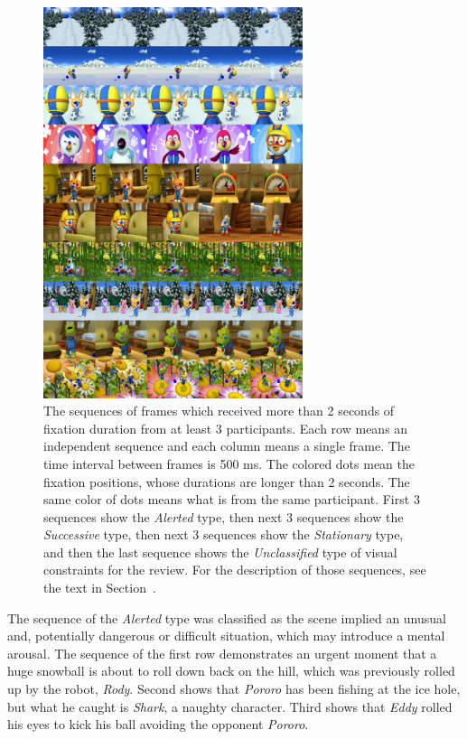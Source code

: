 \documentclass[oneside,master]{snueethesis}
\begin{document}
\begin{figure}
  \centerline{\includegraphics[width=76mm]{./eps/long_fixations_types.png}}
  \caption[The samples of sequence types]{The sequences of frames which received more than 2 seconds of fixation duration from at least 3 participants. Each row means an independent sequence and each column means a single frame. The time interval between frames is 500 ms. The colored dots mean the fixation positions, whose durations are longer than 2 seconds. The same color of dots means what is from the same participant. First 3 sequences show the \textit{Alerted} type, then next 3 sequences show the \textit{Successive} type, then next 3 sequences show the \textit{Stationary} type, and then the last sequence shows the \textit{Unclassified} type of visual constraints for the review. For the description of those sequences, see the text in Section~\textit{}.}
  \label{fig:long-fixations}
\end{figure}

The sequence of the \textit{Alerted} type was classified as the scene implied an unusual and, potentially dangerous or difficult situation, which may introduce a mental arousal. The sequence of the first row demonstrates an urgent moment that a huge snowball is about to roll down back on the hill, which was previously rolled up by the robot, \textit{Rody}. Second shows that \textit{Pororo} has been fishing at the ice hole, but what he caught is \textit{Shark}, a naughty character. Third shows that \textit{Eddy} rolled his eyes to kick his ball avoiding the opponent \textit{Pororo}.
\end{document}
